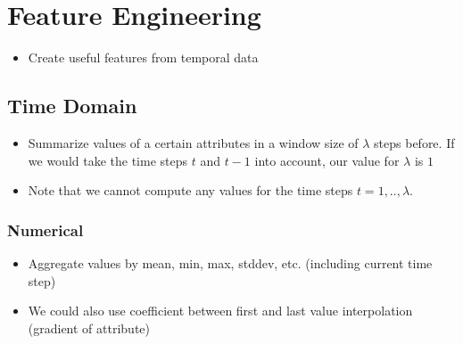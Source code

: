 \section{Feature Engineering}
\label{sec:chapter_4_feature_engineering}
\begin{itemize}
	\item Create useful features from temporal data
\end{itemize}
\subsection{Time Domain}
\begin{itemize}
	\item Summarize values of a certain attributes in a window size of $\lambda$ steps before. If we would take the time steps $t$ and $t-1$ into account, our value for $\lambda$ is $1$
	\item Note that we cannot compute any values for the time steps $t=1,..,\lambda$.
\end{itemize}
\subsubsection{Numerical}
\begin{itemize}
	\item Aggregate values by mean, min, max, stddev, etc. (including current time step)
	\item We could also use coefficient between first and last value interpolation (gradient of attribute)
\end{itemize}
